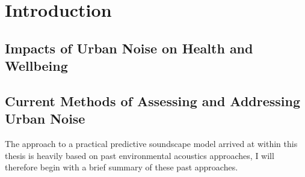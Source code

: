 \documentclass[twoside,fontsize=12pt,titlepage]{scrbook}
\begin{document}





\tableofcontents



\chapter{Introduction}

\section{Impacts of Urban Noise on Health and Wellbeing}

\section{Current Methods of Assessing and Addressing Urban Noise}
 The approach to a practical predictive soundscape model arrived at within this thesis is heavily based on past environmental acoustics approaches, I will therefore begin with a brief summary of these past approaches.
\end{document}
